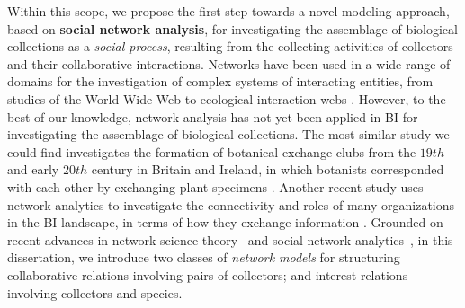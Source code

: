 

Within this scope, we propose the first step towards a novel modeling approach, based on \textbf{social network analysis}, for investigating the assemblage of biological collections as a \textit{social process}, resulting from the collecting activities of collectors and their collaborative interactions.
Networks have been used in a wide range of domains for the investigation of complex systems of interacting entities, from studies of the World Wide Web \cite{Albert1999} to ecological interaction webs \cite{Bascompte2007a}.
However, to the best of our knowledge, network analysis has not yet been applied in BI for investigating the assemblage of biological collections.
The most similar study we could find investigates the formation of botanical exchange clubs from the $19th$ and early $20th$ century in Britain and Ireland, in which botanists corresponded with each other by exchanging plant specimens \cite{Groom2014}.
Another recent study uses network analytics to investigate the connectivity and roles of many organizations in the BI landscape, in terms of how they exchange information \cite{Bingham2017}.
Grounded on recent advances in network science theory~\cite{Barabasibook,Newman2010b} and social network analytics~\cite{Barbier2011,Stork2015}, in this dissertation, we introduce two classes of \textit{network models} for structuring collaborative relations involving pairs of collectors; and interest relations involving collectors and species.


